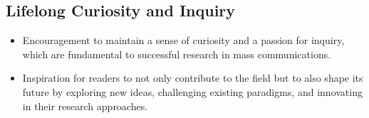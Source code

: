 \documentclass[
]{book}
\begin{document}
\hypertarget{lifelong-curiosity-and-inquiry}{%
\subsection*{Lifelong Curiosity and Inquiry}\label{lifelong-curiosity-and-inquiry}}

\begin{itemize}
\item
  Encouragement to maintain a sense of curiosity and a passion for inquiry, which are fundamental to successful research in mass communications.
\item
  Inspiration for readers to not only contribute to the field but to also shape its future by exploring new ideas, challenging existing paradigms, and innovating in their research approaches.
\end{itemize}

  
\end{document}
